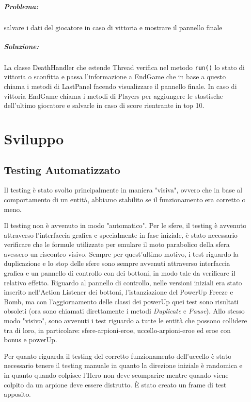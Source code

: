 \documentclass[a4paper,12pt]{report}
\begin{document}
\paragraph{Problema:} salvare i dati del giocatore in caso di vittoria e mostrare il pannello finale 
\paragraph{Soluzione:}  La classe DeathHandler che estende Thread verifica nel metodo \texttt{run()} lo stato di vittoria o sconfitta e passa l’informazione a EndGame che in base a questo chiama i metodi di LastPanel facendo visualizzare il pannello finale.
In caso di vittoria EndGame chiama i metodi di Players per aggiungere le stastische dell’ultimo giocatore e salvarle in caso di score rientrante in top 10.


\chapter{Sviluppo}
\section{Testing Automatizzato}

Il testing è stato svolto principalmente in maniera "visiva", ovvero che in base al comportamento di un entità, abbiamo stabilito se il funzionamento era corretto o meno. 

Il testing non è avvenuto in modo "automatico". Per le sfere, il testing è avvenuto attraverso l'interfaccia grafica e specialmente in fase iniziale, è stato necessario verificare che le formule utilizzate per emulare il moto parabolico della sfera avessero un riscontro visivo. Sempre per quest'ultimo motivo, i test riguardo la duplicazione e lo stop delle sfere sono sempre avvenuti attraverso interfaccia grafica e un pannello di controllo con dei bottoni, in modo tale da verificare il relativo effetto. Riguardo al pannello di controllo, nelle versioni iniziali era stato inserito nell'Action Listener dei bottoni, l'istanziazione del PowerUp Freeze e Bomb, ma con l'aggiornamento delle classi dei powerUp quei test sono risultati obsoleti (ora sono chiamati direttamente i metodi \emph{Duplicate} e \emph{Pause}). Allo stesso modo "visivo", sono avvenuti i test riguardo a tutte le entità che possono collidere tra di loro, in particolare: sfere-arpioni-eroe, uccello-arpioni-eroe ed eroe con bonus e powerUp. 

Per quanto riguarda il testing del corretto funzionamento dell’uccello è stato necessario tenere il testing manuale in quanto la direzione iniziale è randomica e in quanto quando colpisce l’Hero non deve scomparire mentre quando viene colpito da un arpione deve essere distrutto. È stato creato un frame di test apposito.
\end{document}

